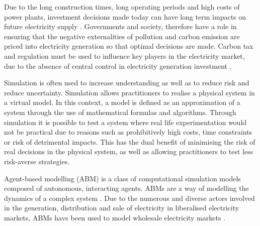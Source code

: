 
 Due to the long construction times, long operating periods and high costs of power plants, investment decisions made today can have long term impacts on future electricity supply \cite{Chappin2017}. Governments and society, therefore have a role in ensuring that the negative externalities of pollution and carbon emission are priced into electricity generation so that optimal decisions are made. Carbon tax and regulation must be used to influence key players in the electricity market, due to the absence of central control in electricity generation investment \cite{May2002}.

Simulation is often used to increase understanding as well as to reduce risk and reduce uncertainty. Simulation allows practitioners to realise a physical system in a virtual model. In this context, a model is defined as an approximation of a system through the use of mathematical formulas and algorithms. Through simulation it is possible to test a system where real life experimentation would not be practical due to reasons such as prohibitively high costs, time constraints or risk of detrimental impacts. This has the dual benefit of minimising the risk of real decisions in the physical system, as well as allowing practitioners to test less risk-averse strategies.

Agent-based modelling (ABM) is a class of computational simulation models composed of autonomous, interacting agents. ABMs are a way of modelling the dynamics of a complex system \cite{MacAl2010}. Due to the numerous and diverse actors involved in the generation, distribution and sale of electricity in liberalised electricity markets, ABMs have been used to model wholesale electricity markets \cite{Ringler2016a}.


